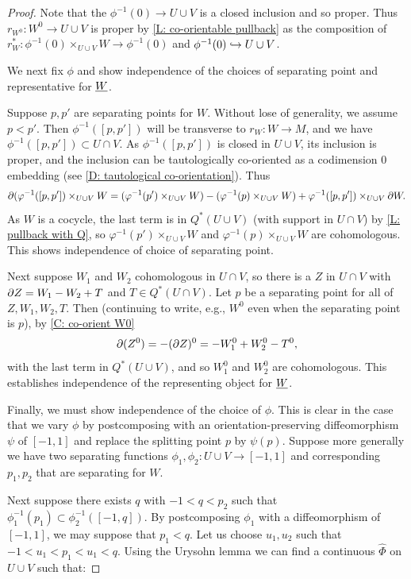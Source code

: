 \begin{proof}
Note that the $\phi^{-1}(0)\to U\cup V$ is a closed inclusion and so proper. Thus $r_{W^0}:W^0\to U\cup V$ is proper by \cref{L: co-orientable pullback} as the composition of $r_W^*:\phi^{-1}(0)\times_{U\cup V}W\to \phi^{-1}(0)$ and $\phi^{-1}(0)\hookrightarrow U\cup V$.


We next fix $\phi$ and show independence of the choices of separating point and representative for $\underline{W}$.

Suppose  $p,p'$  are  separating points for $W$. Without lose of generality, we assume $p<p'$. Then $\phi^{-1}([p,p'])$ will be transverse to $r_W:W\to M$, and we have $\phi^{-1}([p,p'])\subset U\cap V$. As $\phi^{-1}([p,p'])$ is closed in $U\cup V$, its inclusion is proper, and the inclusion can be tautologically co-oriented as a codimension $0$ embedding (see \cref{D: tautological co-orientation}).
Thus $$\partial(\varphi^{-1}([p,p'])\times_{U\cup V} W=(\varphi^{-1}(p')\times_{U\cup V} W)-(\varphi^{-1}(p)\times_{U\cup V} W)+ \varphi^{-1}([p,p'])\times_{U\cup V} \partial W.$$ As $W$ is a cocycle, the last term is in $Q^*(U\cup V)$ (with support in $U\cap V$) by \cref{L: pullback with Q}, so $\varphi^{-1}(p')\times_{U\cup V} W$ and $\varphi^{-1}(p)\times_{U\cup V} W$ are cohomologous. This shows independence of choice of separating point.

Next suppose $W_1$ and $W_2$ cohomologous in $U\cap V$, so there is a $Z$ in $U\cap V$ with $\partial Z=W_1-W_2+T$ and $T\in Q^*(U\cap V)$. Let $p$ be a separating point for all of $Z,W_1,W_2,T$. Then (continuing to write, e.g., $W^0$ even when the separating point is $p$), by \cref{C: co-orient W0}  $$\partial (Z^0)=-(\partial Z)^0=-W_1^0+W_2^0-T^0,$$ with the last term in $Q^*(U\cup V)$, and so $W_1^0$ and $W_2^0$ are cohomologous. This establishes independence of the representing object for $\underline{W}$.

Finally, we must show independence of the choice of $\phi$. This is clear in the case that we vary $\phi$ by postcomposing with an orientation-preserving diffeomorphism $\psi$ of $[-1,1]$ and replace the splitting point $p$ by $\psi(p)$.
Suppose more generally we have two separating functions $\phi_1,\phi_2:U\cup V\to [-1,1]$ and corresponding $p_1,p_2$ that are separating for $W$.

Next suppose there exists $q$ with $-1<q<p_2$ such that $\phi_1^{-1}(p_1)\subset \phi_2^{-1}([-1,q])$. By postcomposing $\phi_1$ with a diffeomorphism of $[-1,1]$, we may suppose that $p_1<q$. Let us choose $u_1,u_2$ such that $-1<u_1<p_1<u_1<q$. Using the Urysohn lemma we can find a continuous $\hat \Phi$ on $U\cup V$ such that:


\end{proof}
